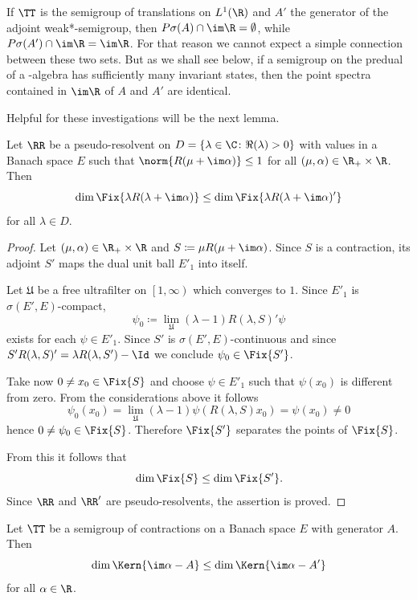 If\/ $\TT$ is the semigroup of translations on $L^1(\R)$ and $A'$ the generator 
of the adjoint weak*-semigroup, then $P\sigma(A) \cap \im\R = \emptyset$, while $P{\sigma}(A') \cap \im\R = \im\R$.
For that reason we cannot expect a simple connection between these two sets.
But as we shall see below, if a semigroup on the predual of a \WA-algebra has sufficiently many invariant states, then the point spectra contained in $\im\R$ of\/ $A$ and $A'$  are identical.

Helpful for these investigations will be the next lemma.
\begin{lemma}\label{lem:d3-1.6}
Let $\RR$ be a pseudo-resolvent on $D = \{\lambda \in \C \colon \Re(\lambda) > 0\}$ with values in a Banach space $E$ such that $\norm{R(\mu + \im\alpha)} \leq 1$ for all $(\mu,\alpha) \in \R_{+} \times \R$.
Then
\[
\dim \Fix{\lambda R(\lambda + \im\alpha)} \leq \dim \Fix{\lambda R(\lambda + \im\alpha)'} 
\]
for all $\lambda \in D$.
\end{lemma}
\begin{proof}
Let $(\mu,\alpha) \in \R_{+} \times \R$ and $S \coloneqq \mu R(\mu + \im\alpha)$.
Since $S$ is a contraction, its adjoint $S'$ maps the dual unit ball $E'_{1}$ into itself.

Let $\mathfrak{U}$ be a free ultrafilter on $ \left[1,\infty \right)$ which converges to $1$.
Since $E'_{1}$ is $\sigma(E',E)$-compact, 
\[
\psi_{0} \coloneqq \lim_{\mathfrak{U}}(\lambda - 1)R(\lambda,S)'\psi
\]
exists for each $\psi \in E'_{1}$.
Since $S'$ is $\sigma(E',E)$-continuous and since $S'R(\lambda,S)' = \lambda R(\lambda,S')-\Id$ we conclude $\psi_{0} \in \Fix  {S'}$.

Take now $0 \neq x_{0} \in \Fix{S}$ and choose $\psi \in E'_{1}$ such that $\psi(x_{0})$ is different from zero.
From the considerations above it follows
\[ 
\psi_{0}(x_{0}) = \lim_{\mathfrak{U}}(\lambda - 1)\psi(R(\lambda,S)x_{0}) = \psi(x_{0}) \neq 0
\]
hence $0 \neq \psi_{0} \in \Fix{S}$.
Therefore $\Fix{S'}$ separates the points of\/ $\Fix{S}$.

From this it follows that
\[
	\dim \Fix{S} \leq \dim \Fix{S'} .
\]
Since $\RR$ and $\RR'$ are pseudo-resolvents, the assertion is proved.
\end{proof}
\begin{corollary}\label{cor:d3-1.7}
Let $\TT$ be a semigroup of contractions on a Banach space $E$ with generator $A$.
Then
\[
\dim \Kern{\im\alpha - A} \leq \dim \Kern{\im\alpha - A'}
\]
for all $\alpha \in \R$.
\end{corollary}


